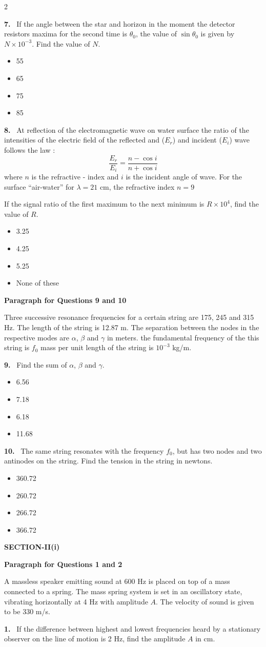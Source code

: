 \documentclass[10pt]{extarticle}
\newcommand{\sect}[1]{\par\smallskip\noindent\textbf{#1}\par}
\newcommand{\qn}[1]{\par\smallskip\noindent\textbf{#1.}~}
\newcommand{\paraq}[2]{\par\smallskip\noindent\textbf{Paragraph for Questions #1 and #2}\par}
\newenvironment{qoptions}{\begin{itemize}[leftmargin=1.8em,itemsep=1pt,topsep=2pt,label={}]}{\end{itemize}}
\newcommand{\opt}[2]{\item[(#1)] #2}
\begin{document}
\begin{multicols}{2}
\qn{7} If the angle between the star and horizon in the moment the detector resistors maxima for the second time is $\theta_0$, the value of $\sin\theta_0$ is given by $N\times10^{-3}$. Find the value of $N$.
\begin{qoptions}
\opt{A}{55}
\opt{B}{65}
\opt{C}{75}
\opt{D}{85}
\end{qoptions}

\qn{8} At reflection of the electromagnetic wave on water surface the ratio of the intensities of the electric field of the reflected and ($E_r$) and incident ($E_i$) wave follows the law :
\[\frac{E_r}{E_i}=\frac{n-\cos i}{n+\cos i}\]
where $n$ is the refractive - index and $i$ is the incident angle of wave. For the surface ``air-water'' for $\lambda=21$ cm, the refractive index $n=9$

If the signal ratio of the first maximum to the next minimum is $R\times10^{4}$, find the value of $R$.
\begin{qoptions}
\opt{A}{3.25}
\opt{B}{4.25}
\opt{C}{5.25}
\opt{D}{None of these}
\end{qoptions}

\paraq{9}{10}
Three successive resonance frequencies for a certain string are 175, 245 and 315 Hz. The length of the string is 12.87 m. The separation between the nodes in the respective modes are $\alpha$, $\beta$ and $\gamma$ in meters. the fundamental frequency of the this string is $f_0$ mass per unit length of the string is $10^{-3}$ kg/m.

\qn{9} Find the sum of $\alpha$, $\beta$ and $\gamma$.
\begin{qoptions}
\opt{A}{6.56}
\opt{B}{7.18}
\opt{C}{6.18}
\opt{D}{11.68}
\end{qoptions}

\qn{10} The same string resonates with the frequency $f_0$, but has two nodes and two antinodes on the string. Find the tension in the string in newtons.
\begin{qoptions}
\opt{A}{360.72}
\opt{B}{260.72}
\opt{C}{266.72}
\opt{D}{366.72}
\end{qoptions}

\sect{SECTION-II(i)}
\paraq{1}{2}
A massless speaker emitting sound at 600 Hz is placed on top of a mass connected to a spring. The mass spring system is set in an oscillatory state, vibrating horizontally at 4 Hz with amplitude $A$. The velocity of sound is given to be 330 m/s.

\qn{1} If the difference between highest and lowest frequencies heard by a stationary observer on the line of motion is 2 Hz, find the amplitude $A$ in cm.


\end{multicols}
\end{document}
